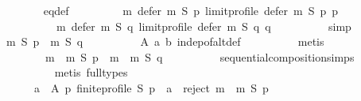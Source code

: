 \begin{isabellebody}
\ \ \ \ \ \ \isamarkupfalse%
\ eq{\isacharunderscore}{\kern0pt}def\ \isamarkupfalse%
\isanewline
\ \ \ \ \ \ \ \ {\isachardoublequoteopen}m{}\ {\isacharparenleft}{\kern0pt}defer\ m\ S\ p{\isacharparenright}{\kern0pt}\ {\isacharparenleft}{\kern0pt}limit{\isacharunderscore}{\kern0pt}profile\ {\isacharparenleft}{\kern0pt}defer\ m\ S\ p{\isacharparenright}{\kern0pt}\ p{\isacharparenright}{\kern0pt}\ {\isacharequal}{\kern0pt}\isanewline
\ \ \ \ \ \ \ \ \ \ m{}\ {\isacharparenleft}{\kern0pt}defer\ m\ S\ q{\isacharparenright}{\kern0pt}\ {\isacharparenleft}{\kern0pt}limit{\isacharunderscore}{\kern0pt}profile\ {\isacharparenleft}{\kern0pt}defer\ m\ S\ q{\isacharparenright}{\kern0pt}\ q{\isacharparenright}{\kern0pt}{\isachardoublequoteclose}\isanewline
\ \ \ \ \ \ \ \ \isamarkupfalse%
\ simp\isanewline
\ \ \ \ \ \ \isamarkupfalse%
\ \isamarkupfalse%
\ {\isachardoublequoteopen}m\ S\ p\ {\isacharequal}{\kern0pt}\ m\ S\ q{\isachardoublequoteclose}\isanewline
\ \ \ \ \ \ \ \ \isamarkupfalse%
\ A\ a\ b\ indep{\isacharunderscore}{\kern0pt}of{\isacharunderscore}{\kern0pt}alt{\isacharunderscore}{\kern0pt}def\isanewline
\ \ \ \ \ \ \ \ \isamarkupfalse%
\ metis\isanewline
\ \ \ \ \ \ \isamarkupfalse%
\ \isamarkupfalse%
\isanewline
\ \ \ \ \ \ \ \ {\isachardoublequoteopen}{\isacharparenleft}{\kern0pt}m\ {\isasymtriangleright}\ m{}{\isacharparenright}{\kern0pt}\ S\ p\ {\isacharequal}{\kern0pt}\ {\isacharparenleft}{\kern0pt}m\ {\isasymtriangleright}\ m{}{\isacharparenright}{\kern0pt}\ S\ q{\isachardoublequoteclose}\isanewline
\ \ \ \ \ \ \ \ \isamarkupfalse%
\ sequential{\isacharunderscore}{\kern0pt}composition{\isachardot}{\kern0pt}simps\isanewline
\ \ \ \ \ \ \ \ \isamarkupfalse%
\ {\isacharparenleft}{\kern0pt}metis\ {\isacharparenleft}{\kern0pt}full{\isacharunderscore}{\kern0pt}types{\isacharparenright}{\kern0pt}{\isacharparenright}{\kern0pt}\isanewline
\ \ \ \ \isamarkupfalse%
\isanewline
\ \ \ \ \isamarkupfalse%
\ \isamarkupfalse%
\isanewline
\ \ \ \ \ \ {\isachardoublequoteopen}{\isasymforall}a\ {\isasymin}\ A{\isachardot}{\kern0pt}\ {\isasymforall}p{\isachardot}{\kern0pt}\ finite{\isacharunderscore}{\kern0pt}profile\ S\ p\ {\isasymlongrightarrow}\ a\ {\isasymin}\ reject\ {\isacharparenleft}{\kern0pt}m\ {\isasymtriangleright}\ m{}{\isacharparenright}{\kern0pt}\ S\ p{\isachardoublequoteclose}\isanewline

\end{isabellebody}
